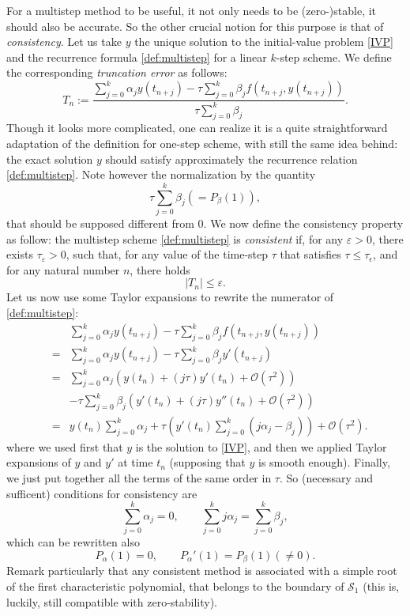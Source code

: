 \documentclass{article}
\begin{document}
For a multistep method to be useful, it not only needs to be (zero-)stable, it should also be accurate. So the other crucial notion for this purpose is that of \emph{consistency}. %
Let us take $y$ the unique solution to the initial-value problem \eqref{IVP} and the recurrence formula \eqref{def:multistep} for a linear $k$-step scheme. We define the corresponding \emph{truncation error} as follows:
\begin{equation} \label{def:trunc_multistep}
T_n := \frac{\sum_{j=0}^k \alpha_j y(t_{n+j}) - \tau \sum_{j=0}^k \beta_j f ( t_{n+j} , y(t_{n+j}) )}{\tau \sum_{j=0}^k \beta_j}.  \end{equation}
Though it looks more complicated, one can realize it is a quite straightforward adaptation of the definition for one-step scheme, with still the same idea behind: the exact solution $y$ should satisfy approximately the recurrence relation \eqref{def:multistep}. Note however the normalization by the quantity
\[
\tau \sum_{j=0}^k \beta_j ( = P_\beta (1) ),
\]
that should be supposed different from 0. We now define the consistency property as follow: the multistep scheme \eqref{def:multistep} is \emph{consistent} if, for any $\varepsilon > 0$, there exists $\tau_\varepsilon > 0$, such that, for any value of the time-step $\tau$ that satisfies $\tau \leq \tau_\epsilon$, and for any natural number $n$, there holds
\[
|T_n| \leq \varepsilon.
\]
Let us now use some Taylor expansions to rewrite the numerator of \eqref{def:multistep}:
\begin{eqnarray*}
& & \sum_{j=0}^k \alpha_j y(t_{n+j}) - \tau \sum_{j=0}^k \beta_j f ( t_{n+j} , y(t_{n+j}) )\\
& = & \sum_{j=0}^k \alpha_j y(t_{n+j}) - \tau \sum_{j=0}^k \beta_j y'(t_{n+j}) \\
& = & \sum_{j=0}^k \alpha_j \left ( y(t_{n}) + (j\tau) y'(t_n) + \mathcal{O}(\tau^2) \right ) \\ 
& & - \tau \sum_{j=0}^k \beta_j \left ( y'(t_{n}) + (j\tau) y''(t_n) + \mathcal{O}(\tau^2) \right )\\
& = & 
y(t_{n}) \sum_{j=0}^k \alpha_j +
\tau \left ( y'(t_n) \sum_{j=0}^k (j \alpha_j - \beta_j ) \right )
+ \mathcal{O}(\tau^2).
\end{eqnarray*}
where we used first that $y$ is the solution to \eqref{IVP}, and then we applied Taylor expansions of $y$ and $y'$ at time $t_n$ (supposing that $y$ is smooth enough). Finally, we just put together all the terms of the same order in $\tau$. So (necessary and sufficent) conditions for consistency are
\[
\sum_{j=0}^k \alpha_j = 0, \qquad \sum_{j=0}^k j \alpha_j = \sum_{j=0}^k \beta_j,
\]
which can be rewritten also
\[
P_\alpha (1) = 0, \qquad P_\alpha'(1) = P_\beta(1) (\neq 0).
\]
Remark particularly that any consistent method is associated with a simple root of the first characteristic polynomial, that belongs to the boundary of $\mathcal{S}_1$ (this is, luckily, still compatible with zero-stability).
\end{document}
